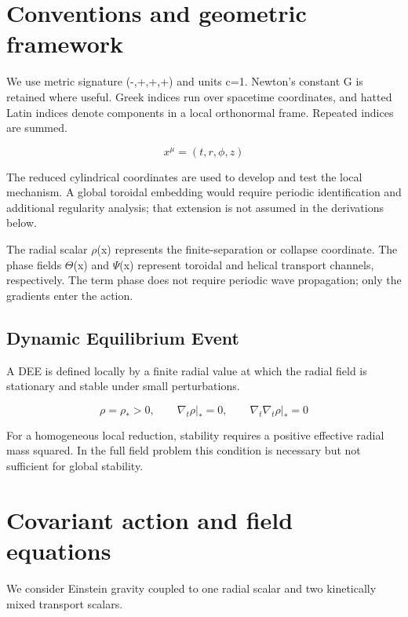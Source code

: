 \documentclass[aps,prd,preprint,nofootinbib,superscriptaddress]{revtex4-2}
\begin{document}
\section{Conventions and geometric framework}

We use metric signature (-,+,+,+) and units c=1. Newton's constant G is retained where useful. Greek indices run over spacetime coordinates, and hatted Latin indices denote components in a local orthonormal frame. Repeated indices are summed.


\begin{equation}
x^\mu=(t,r,\phi,z)
\tag{1}\label{eq:1}
\end{equation}

The reduced cylindrical coordinates are used to develop and test the local mechanism. A global toroidal embedding would require periodic identification and additional regularity analysis; that extension is not assumed in the derivations below.


The radial scalar $\rho$(x) represents the finite-separation or collapse coordinate. The phase fields $\Theta$(x) and $\Psi$(x) represent toroidal and helical transport channels, respectively. The term phase does not require periodic wave propagation; only the gradients enter the action.


\subsection{Dynamic Equilibrium Event}

A DEE is defined locally by a finite radial value at which the radial field is stationary and stable under small perturbations.


\begin{equation}
\rho=\rho_*>0,\qquad \nabla_t\rho\big|_*=0,\qquad \nabla_t\nabla_t\rho\big|_*=0
\tag{2}\label{eq:2}
\end{equation}

For a homogeneous local reduction, stability requires a positive effective radial mass squared. In the full field problem this condition is necessary but not sufficient for global stability.


\section{Covariant action and field equations}

We consider Einstein gravity coupled to one radial scalar and two kinetically mixed transport scalars.
\end{document}
